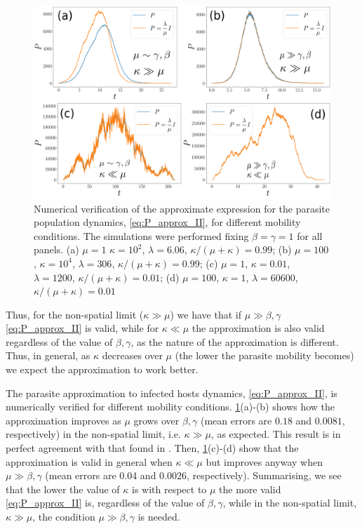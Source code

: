 \begin{figure}[H]
    \centering
    \includegraphics[width=\columnwidth]{Figures/P_approx.png}
    \caption{Numerical verification of the approximate expression for the
        parasite population dynamics, \cref{eq:P_approx_II}, for different
        mobility
        conditions. The simulations were performed fixing $\beta=\gamma=1$  for
        all
        panels. (a) $\mu=1$ $\kappa=10^2$, $\lambda=6.06$,
        $\kappa/(\mu+\kappa)=0.99$;
        (b) $\mu=100$, $\kappa=10^4$, $\lambda=306$,
        $\kappa/(\mu+\kappa)=0.99$; (c)
        $\mu=1$, $\kappa=0.01$, $\lambda=1200$, $\kappa/(\mu+\kappa)=0.01$; (d)
        $\mu=100$, $\kappa=1$, $\lambda=60600$,  $\kappa/(\mu+\kappa)=0.01$}
    \label{fig:P_approx}
\end{figure}

Thus, for the non-spatial limit ($\kappa\gg\mu$) we have that if
$\mu\gg\beta,\gamma$ \cref{eq:P_approx_II} is valid, while for $\kappa\ll\mu$
the
approximation is also valid regardless of the value of $\beta,\gamma$, as the
nature of the approximation is different. Thus, in general, as $\kappa$
decreases over $\mu$ (the lower the parasite mobility becomes) we expect the
approximation to work better.

The parasite approximation to infected hosts dynamics, \cref{eq:P_approx_II},
is numerically verified for different mobility conditions.
\cref{fig:P_approx}(a)-(b) shows how the approximation improves as $\mu$ grows
over $\beta,\gamma$ (mean errors are $0.18$ and $0.0081$, respectively) in the
non-spatial limit, i.e. $\kappa\gg\mu$, as expected. This result is in perfect
agreement with that found in \cite{GimenezRomero2021}. Then,
\cref{fig:P_approx}(c)-(d) show that the approximation is valid in general when
$\kappa\ll\mu$ but improves anyway when $\mu\gg\beta,\gamma$ (mean errors are
0.04 and 0.0026, respectively). Summarising, we see that the lower the value of
$\kappa$ is with respect to $\mu$ the more valid \cref{eq:P_approx_II} is,
regardless of the value of $\beta,\gamma$, while in the non-spatial limit,
$\kappa\gg\mu$, the condition $\mu\gg\beta,\gamma$ is needed.


